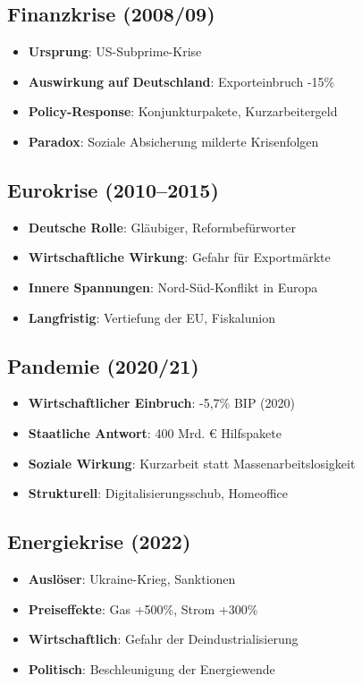 \subsection{Finanzkrise (2008/09)}
\begin{itemize}
\item \textbf{Ursprung}: US-Subprime-Krise
\item \textbf{Auswirkung auf Deutschland}: Exporteinbruch -15\%
\item \textbf{Policy-Response}: Konjunkturpakete, Kurzarbeitergeld
\item \textbf{Paradox}: Soziale Absicherung milderte Krisenfolgen
\end{itemize}

\subsection{Eurokrise (2010--2015)}
\begin{itemize}
\item \textbf{Deutsche Rolle}: Gläubiger, Reformbefürworter
\item \textbf{Wirtschaftliche Wirkung}: Gefahr für Exportmärkte
\item \textbf{Innere Spannungen}: Nord-Süd-Konflikt in Europa
\item \textbf{Langfristig}: Vertiefung der EU, Fiskalunion
\end{itemize}

\subsection{Pandemie (2020/21)}
\begin{itemize}
\item \textbf{Wirtschaftlicher Einbruch}: -5,7\% BIP (2020)
\item \textbf{Staatliche Antwort}: 400 Mrd. € Hilfspakete
\item \textbf{Soziale Wirkung}: Kurzarbeit statt Massenarbeitslosigkeit
\item \textbf{Strukturell}: Digitalisierungsschub, Homeoffice
\end{itemize}

\subsection{Energiekrise (2022)}
\begin{itemize}
\item \textbf{Auslöser}: Ukraine-Krieg, Sanktionen
\item \textbf{Preiseffekte}: Gas +500\%, Strom +300\%
\item \textbf{Wirtschaftlich}: Gefahr der Deindustrialisierung
\item \textbf{Politisch}: Beschleunigung der Energiewende
\end{itemize}

